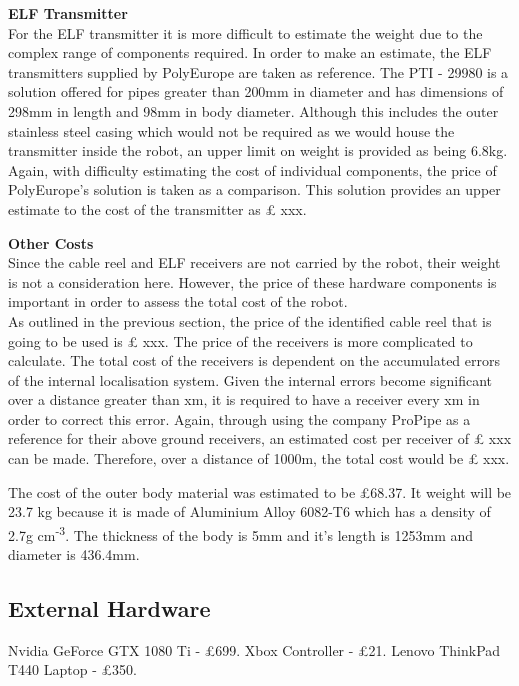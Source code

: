 \documentclass[11pt]{article}		%
\begin{document}
	        \textbf{ELF Transmitter}\\
	        For the ELF transmitter it is more difficult to estimate the weight due to the complex range of components required. In order to make an estimate, the ELF transmitters supplied by PolyEurope are taken as reference. The PTI - 29980 is a solution offered for pipes greater than 200mm in diameter and has dimensions of 298mm in length and 98mm in body diameter. Although this includes the outer stainless steel casing which would not be required as we would house the transmitter inside the robot, an upper limit on weight is provided as being 6.8kg.\\
	        \hspace*{3ex}Again, with difficulty estimating the cost of individual components, the price of PolyEurope’s solution is taken as a comparison. This solution provides an upper estimate to the cost of the transmitter as £ xxx. 
	    
	        \textbf{Other Costs}\\
	
	        Since the cable reel and ELF receivers are not carried by the robot, their weight is not a consideration here. However, the price of these hardware components is important in order to assess the total cost of the robot. \\
		    \hspace*{3ex}As outlined in the previous section, the price of the identified cable reel that is going to be used is £ xxx. The price of the receivers is more complicated to calculate. The total cost of the receivers is dependent on the accumulated errors of the internal localisation system. Given the internal errors become significant over a distance greater than xm, it is required to have a receiver every xm in order to correct this error. Again, through using the company ProPipe as a reference for their above ground receivers, an estimated cost per receiver of £ xxx can be made. Therefore, over a distance of 1000m, the total cost would be £ xxx. 
		    
		    The cost of the outer body material was estimated to be £68.37. It weight will be 23.7 kg because it is made of Aluminium Alloy 6082-T6 which has a density of 2.7g cm\textsuperscript{-3}. The thickness of the body is 5mm and it's length is 1253mm and diameter is 436.4mm.

		\subsection{External Hardware}
			Nvidia GeForce GTX 1080 Ti - £699. Xbox Controller - £21. Lenovo ThinkPad T440 Laptop - £350.
		
\end{document}
